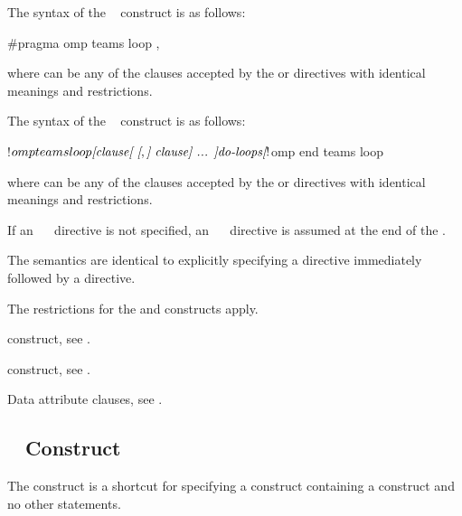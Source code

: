 \syntax
\begin{ccppspecific}
The syntax of the ~ construct is as follows:

\begin{ompcPragma}
#pragma omp teams loop \plc{[clause[ [},\plc{] clause] ... ] new-line}
\end{ompcPragma}

where  can be any of the clauses accepted by the  or
 directives with identical meanings and restrictions.
\end{ccppspecific}

\begin{fortranspecific}
The syntax of the ~ construct is as follows:

\begin{ompfPragma}
!$omp teams loop \plc{[clause[ [},\plc{] clause] ... ]}
    \plc{do-loops}
\plc{[}!$omp end teams loop\plc{]}
\end{ompfPragma}

where  can be any of the clauses accepted by the  or
 directives with identical meanings and restrictions.

If an ~~ directive is not specified, an
~~ directive is assumed at the end of the 
.
\end{fortranspecific}

\descr
The semantics are identical to explicitly specifying a  directive 
immediately followed by a  directive.

\restrictions
The restrictions for the  and  constructs apply.

\begin{crossrefs}
\item {} construct, see
.

\item {} construct, see
.

\item Data attribute clauses, see
.
\end{crossrefs}



\subsection{~ Construct}
\label{subsec:target parallel Construct}
\summary
The   construct is a shortcut for specifying a 
 construct containing a  construct and no other statements.

